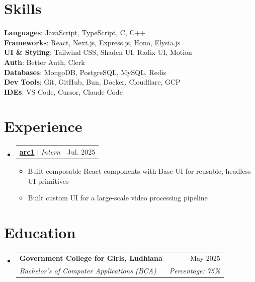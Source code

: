\documentclass[letterpaper,11pt]{article}
\makeatletter
\newcommand{\resumeItem}[1]{
  \item\small{
    {#1 \vspace{-2pt}}
  }
}
\newcommand{\resumeSubheading}[4]{
  \vspace{-2pt}\item
    \begin{tabular*}{0.97\textwidth}[t]{l@{\extracolsep{\fill}}r}
      \textbf{#1} & #2 \\
      \textit{\small#3} & \textit{\small #4} \\
    \end{tabular*}\vspace{-7pt}
}
\newcommand{\resumeProjectHeading}[2]{
    \item
    \begin{tabular*}{0.97\textwidth}{l@{\extracolsep{\fill}}r}
      \small#1 & #2 \\
    \end{tabular*}\vspace{-7pt}
}
\newcommand{\resumeSubHeadingListStart}{\begin{itemize}[leftmargin=0.15in, label={}]}
\newcommand{\resumeSubHeadingListEnd}{\end{itemize}}
\newcommand{\resumeItemListStart}{\begin{itemize}}
\newcommand{\resumeItemListEnd}{\end{itemize}\vspace{-5pt}}
\makeatother
\begin{document}
\section{Skills}
 \begin{itemize}[leftmargin=0.15in, label={}]
    \small{\item{
     \textbf{Languages}{: JavaScript, TypeScript, C, C++} \\
     \textbf{Frameworks}{: React, Next.js, Express.js, Hono, Elysia.js} \\
     \textbf{UI \& Styling}{: Tailwind CSS, Shadcn UI, Radix UI, Motion} \\
     \textbf{Auth}{: Better Auth, Clerk} \\
     \textbf{Databases}{: MongoDB, PostgreSQL, MySQL, Redis} \\
     \textbf{Dev Tools}{: Git, GitHub, Bun, Docker, Cloudflare, GCP} \\
     \textbf{IDEs}{: VS Code, Cursor, Claude Code}
    }}
 \end{itemize}

\section{Experience}
  \resumeSubHeadingListStart

          \resumeProjectHeading
          {\textbf{\href{https://arc1.io}{arc1}} $|$ \footnotesize\emph{Intern}}{Jul. 2025}
         \resumeItemListStart
            \resumeItem{Built composable React components with Base UI for reusable, headless UI primitives}
            \resumeItem{Built custom UI for a large-scale video processing pipeline}
         \resumeItemListEnd
          
    \resumeSubHeadingListEnd 

\section{Education}
  \resumeSubHeadingListStart
  
    \resumeSubheading
      {Government College for Girls, Ludhiana}{May 2025}
      {Bachelor's of Computer Applications (BCA)}{Percentage: 75\%}

  \resumeSubHeadingListEnd
\end{document}
